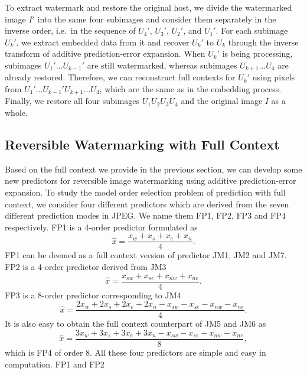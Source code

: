 \documentclass[journal]{IEEEtran}
\begin{document}
To extract watermark and restore the original host, we divide the watermarked image $I'$ into the
same four subimages and consider them separately in the inverse order, i.e.\ in the sequence of
$U_4'$, $U_3'$, $U_2'$, and $U_1'$. For each subimage $U_k'$, we extract embedded data from it and
recover $U_k'$ to $U_k$ through the inverse transform of additive prediction-error expansion. When
$U_k'$ is being processing, subimages $U_1' \dots U_{k-1}'$ are still watermarked, whereas subimages
$U_{k+1} \dots U_4$ are already restored. Therefore, we can reconstruct full contexts for $U_k'$
using pixels from $U_1' \dots U_{k-1}'U_{k+1} \dots U_4$, which are the same as in the embedding
process. Finally, we restore all four subimages $U_1U_2U_3U_4$ and the original image $I$ as
a whole. 

\subsection{Reversible Watermarking with Full Context}
Based on the full context we provide in the previous section, we can develop some new predictors for
reversible image watermarking using additive prediction-error expansion. To study the model order
selection problem of prediction with full context, we consider four different predictors which are
derived from the seven different prediction modes in JPEG. We name them FP1, FP2, FP3 and FP4
respectively. FP1 is a 4-order predictor formulated as
\begin{equation}\label{eqn:fp1}
    \hat{x} = \frac{x_w + x_s + x_e + x_n}{4}.
\end{equation}
FP1 can be deemed as a full context version of predictor JM1, JM2 and JM7. FP2 is a 4-order
predictor derived from JM3
\begin{equation}\label{eqn:fp2}
    \hat{x} = \frac{x_{sw} + x_{se} + x_{nw} + x_{ne}}{4}.
\end{equation}
FP3 is a 8-order predictor corresponding to JM4
\begin{equation}\label{eqn:fp3}
    \hat{x} = \frac{2x_w + 2x_s + 2x_e + 2x_n - x_{sw} - x_{se} - x_{nw} - x_{ne}}{4}.
\end{equation}
It is also easy to obtain the full context counterpart of JM5 and JM6 as 
\begin{equation}\label{eqn:fp4}
    \hat{x} = \frac{3x_w + 3x_s + 3x_e + 3x_n - x_{sw} - x_{se} - x_{nw} - x_{ne}}{8},
\end{equation}
which is FP4 of order 8. All these four predictors are simple and easy in computation. FP1 and FP2
\end{document}
